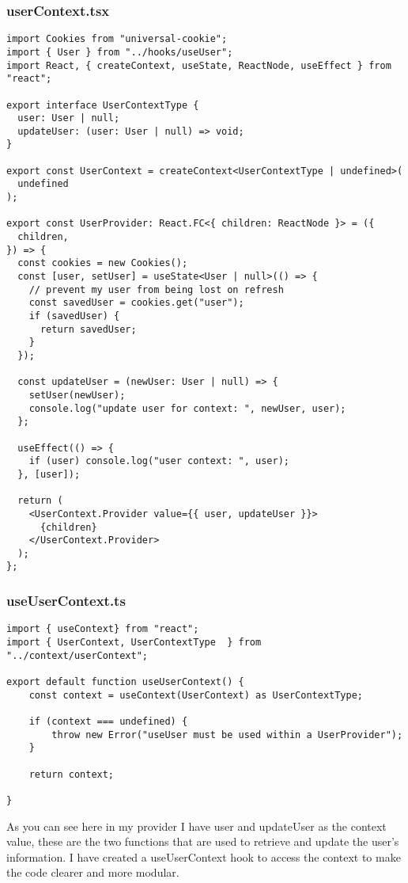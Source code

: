 \subsubsection{userContext.tsx}
\begin{verbatim}
import Cookies from "universal-cookie";
import { User } from "../hooks/useUser";
import React, { createContext, useState, ReactNode, useEffect } from "react";

export interface UserContextType {
  user: User | null;
  updateUser: (user: User | null) => void;
}

export const UserContext = createContext<UserContextType | undefined>(
  undefined
);

export const UserProvider: React.FC<{ children: ReactNode }> = ({
  children,
}) => {
  const cookies = new Cookies();
  const [user, setUser] = useState<User | null>(() => {
    // prevent my user from being lost on refresh
    const savedUser = cookies.get("user");
    if (savedUser) {
      return savedUser;
    }
  });

  const updateUser = (newUser: User | null) => {
    setUser(newUser);
    console.log("update user for context: ", newUser, user);
  };

  useEffect(() => {
    if (user) console.log("user context: ", user);
  }, [user]);

  return (
    <UserContext.Provider value={{ user, updateUser }}>
      {children}
    </UserContext.Provider>
  );
};
\end{verbatim}


\subsubsection{useUserContext.ts}
\begin{verbatim}
import { useContext} from "react";
import { UserContext, UserContextType  } from "../context/userContext";

export default function useUserContext() {
    const context = useContext(UserContext) as UserContextType;

    if (context === undefined) {
        throw new Error("useUser must be used within a UserProvider");
    }

    return context;

}
\end{verbatim}

As you can see here in my provider I have user and updateUser as the context value, these are the two functions that are used to retrieve and update the user's information. I have created a useUserContext hook to access the context to make the code clearer and more modular.


